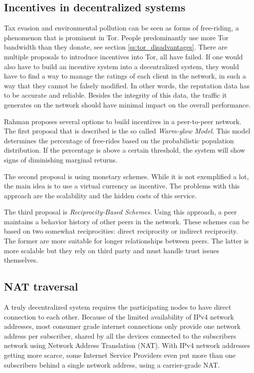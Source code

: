 \documentclass{article}
\begin{document}
	\subsection{Incentives in decentralized systems}
		Tax evasion and environmental pollution can be seen as forms of free-riding, a phenomenon that is prominent in Tor. People predominantly use more Tor bandwidth than they donate, see section \ref{ss:tor_disadvantages}. There are multiple proposals \cite{dingledine2010building, jansen13lira} to introduce incentives into Tor, all have failed. If one would also have to build an incentive system into a decentralized system, they would have to find a way to manage the ratings of each client in the network, in such a way that they cannot be falsely modified. In other words, the reputation data has to be accurate and reliable. Besides the integrity of this data, the traffic it generates on the network should have minimal impact on the overall performance.
		
		Rahman \cite{rahman2009survey} proposes several options to build incentives in a peer-to-peer network. The first proposal that is described is the so called \emph{Warm-glow Model}. This model determines the percentage of free-rides based on the probabilistic population distribution. If the percentage is above a certain threshold, the system will show signs of diminishing marginal returns.
		
		The second proposal is using monetary schemes. While it is not exemplified a lot, the main idea is to use a virtual currency as incentive. The problems with this approach are the scalability and the hidden costs of this service.
		
		The third proposal is \emph{Reciprocity-Based Schemes}. Using this approach, a peer maintains a behavior history of other peers in the network. These schemes can be based on two somewhat reciprocities: direct reciprocity or indirect reciprocity. The former are more suitable for longer relationships between peers. The latter is more scalable but they rely on third party and must handle trust issues themselves.
		
	\subsection{NAT traversal}
		A truly decentralized system requires the participating nodes to have direct connection to each other. Because of the limited availability of IPv4 network addresses, most consumer grade internet connections only provide one network address per subscriber, shared by all the devices connected to the subscribers network using Network Address Translation (NAT). With IPv4 network addresses getting more scarce, some Internet Service Providers even put more than one subscribers behind a single network address, using a carrier-grade NAT.
		
\end{document}
